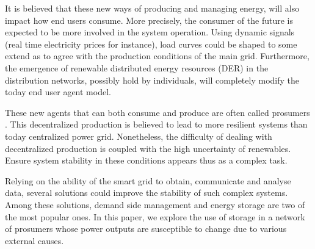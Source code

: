 \documentclass[conference]{IEEEtran}
\begin{document}
It is believed that these new ways of producing and managing energy, will also impact how end users consume. More precisely, the consumer   of the future is expected to be more involved in the system operation. Using dynamic signals (real time electricity prices for instance), load curves could be shaped to some extend as to agree with the production conditions of the main grid.
Furthermore, the emergence of renewable distributed energy resources (DER) in the distribution networks, possibly hold by individuals,
will completely modify the today end user agent model.

These new agents that can both consume and produce are often called prosumers \cite{Rathnayaka2012}. This decentralized production is believed to lead to more resilient systems than today centralized power grid. Nonetheless, the difficulty of dealing with decentralized production is coupled with the high uncertainty of renewables. Ensure system stability in these conditions appears thus as a complex task. 

Relying on the ability of the smart grid to obtain, communicate and analyse data, several solutions could  improve the stability of such complex systems. Among these solutions, demand side management and energy storage are two of the most popular ones. In this paper, we explore the use of storage in a network of prosumers whose power outputs are susceptible to change due to various external causes. 



\end{document}
